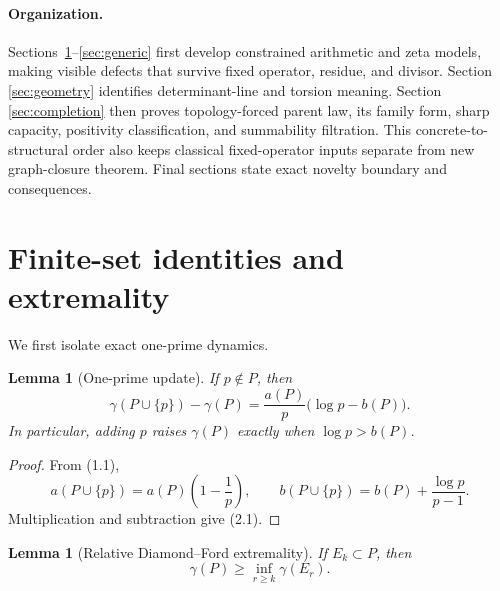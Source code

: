 \documentclass[11pt]{article}
\newtheorem{lemma}[theorem]{Lemma}
\theoremstyle{definition}
\theoremstyle{remark}
\begin{document}
\paragraph{Organization.}
Sections~\ref{sec:finite}--\ref{sec:generic} first develop constrained arithmetic and zeta
models, making visible defects that survive fixed operator, residue, and divisor.  Section
\ref{sec:geometry} identifies determinant-line and torsion meaning.  Section
\ref{sec:completion} then proves topology-forced parent law, its family form, sharp capacity,
positivity classification, and summability filtration.  This concrete-to-structural order also
keeps classical fixed-operator inputs separate from new graph-closure theorem.  Final sections
state exact novelty boundary and consequences.

\section{Finite-set identities and extremality}
\label{sec:finite}

We first isolate exact one-prime dynamics.

\begin{lemma}[One-prime update]
\label{lem:update}
If $p\notin P$, then
\begin{equation}
 \gamma(P\cup\{p\})-\gamma(P)
 =\frac{a(P)}p\bigl(\log p-b(P)\bigr).                    \tag{2.1}
\end{equation}
In particular, adding $p$ raises $\gamma(P)$ exactly when $\log p>b(P)$.
\end{lemma}

\begin{proof}
From (1.1),
\[
 a(P\cup\{p\})=a(P)\left(1-\frac1p\right),\qquad
 b(P\cup\{p\})=b(P)+\frac{\log p}{p-1}.
\]
Multiplication and subtraction give (2.1).
\end{proof}

\begin{lemma}[Relative Diamond--Ford extremality]
\label{lem:relative-extremal}
If $E_k\subset P$, then
\begin{equation}
 \gamma(P)\geq\inf_{r\geq k}\gamma(E_r).                 \tag{2.2}
\end{equation}
\end{lemma}
\end{document}
